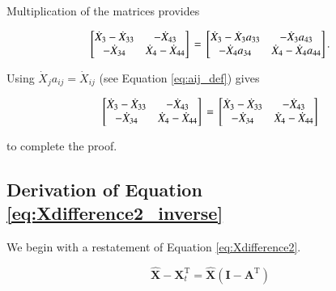 \documentclass[authoryear,preprint,review,12pt]{elsarticle}
\let\oldhat\hat
\renewcommand{\vec}[1]{\mathbf{#1}}
\renewcommand{\hat}[1]{\oldhat{\mathbf{#1}}}
\begin{document}
\noindent Multiplication of the matrices provides

\begin{equation} \label{eq:Xdifference2Proof-3}
\begin{bmatrix} 	\dot{X}_{3} - \dot{X}_{33} & - \dot{X}_{43}	\\
				- \dot{X}_{34} & \dot{X}_{4} - \dot{X}_{44}	\\
\end{bmatrix} \\
= \\
\begin{bmatrix} 	\dot{X}_{3} - \dot{X}_3 a_{33} & - \dot{X}_3 a_{43}	\\
				- \dot{X}_4 a_{34} & \dot{X}_{4} - \dot{X}_4 a_{44}	\\
\end{bmatrix}.
\end{equation}

\noindent Using $\dot{X}_j a_{ij} = \dot{X}_{ij}$ (see Equation \ref{eq:aij_def}) gives

\begin{equation} \label{eq:Xdifference2Proof-4}
\begin{bmatrix} 	\dot{X}_{3} - \dot{X}_{33} & - \dot{X}_{43}	\\
				- \dot{X}_{34} & \dot{X}_{4} - \dot{X}_{44}	\\
\end{bmatrix} \\
= \\
\begin{bmatrix} 	\dot{X}_{3} - \dot{X}_{33} & - \dot{X}_{43}	\\
				- \dot{X}_{34} & \dot{X}_{4} - \dot{X}_{44}	\\
\end{bmatrix}
\end{equation}

\noindent to complete the proof.

\subsection{Derivation of Equation \ref{eq:Xdifference2_inverse}}

We begin with a restatement of Equation \ref{eq:Xdifference2}.

\begin{equation} \label{eq:Xdifference2_inverse_Proof-1}
	\hat{\vec{X}} - \vec{X}_t^\mathrm{T} = \hat{\vec{X}}(\vec{I} - \vec{A}^\mathrm{T})
\end{equation}
\end{document}
